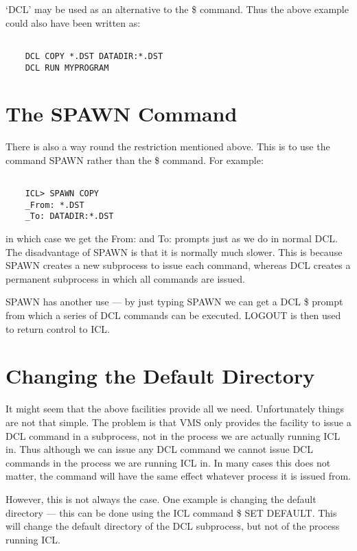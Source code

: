 \documentclass[twoside,11pt]{report}
\newcommand{\xlabel}[1]{}
\begin{document}
`DCL' may be used as an alternative to the \$ command. Thus the
above example could also have been written as:

\begin{verbatim}

    DCL COPY *.DST DATADIR:*.DST
    DCL RUN MYPROGRAM

\end{verbatim}

\section{\xlabel{the_spawn_command}The SPAWN Command}
There is also a way round the restriction mentioned above. This is to 
use the command SPAWN rather than the \$ command. For example:

\begin{verbatim}

    ICL> SPAWN COPY
    _From: *.DST
    _To: DATADIR:*.DST

\end{verbatim}
in which case we get the From: and To: prompts just as we do in normal DCL.
The disadvantage of SPAWN is that it is normally much slower. This is because
SPAWN creates a new subprocess to issue each command, whereas DCL creates
a permanent subprocess in which all commands are issued.

SPAWN has another use --- by just typing SPAWN we can get a DCL \$ prompt
from which a series of DCL commands can be executed. LOGOUT is then used
to return control to ICL.

\section{\xlabel{changing_the_default_directory}Changing the Default Directory}
It might seem that the above facilities provide all we need. Unfortunately
things are not that simple. The problem is that VMS only provides the facility
to issue a DCL command in a subprocess, not in the process we are actually
running ICL in. Thus although we can issue any DCL command we cannot issue
DCL commands in the process we are running ICL in. In many cases this does not
matter, the command will have the same effect whatever process it is issued
from.

However, this is not always the case. One example is changing the default
directory --- this can be done using the ICL command \$ SET DEFAULT. This 
will change the default directory of the DCL subprocess, but not of the 
process running ICL.
\end{document}
